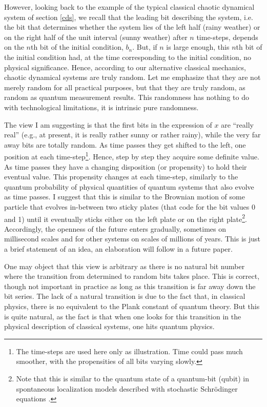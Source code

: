 \documentclass[floatfix,12pt]{article}
\begin{document}
However, looking back to the example of the typical classical chaotic dynamical system of section \ref{cds}, we recall that the leading bit describing the system, i.e. the bit that determines whether the system lies of the left half (rainy weather) or on the right half of the unit interval (sunny weather) after $n$ time-steps, depends on the $n$th bit of the initial condition, $b_n$. But, if $n$ is large enough, this $n$th bit of the initial condition had, at the time corresponding to the initial condition, no physical significance. Hence, according to our alternative classical mechanics, chaotic dynamical systems are truly random. Let me emphasize that they are not merely random for all practical purposes, but that they are truly random, as random as quantum measurement results. This randomness has nothing to do with technological limitations, it is intrinsic pure randomness.

The view I am suggesting is that the first bits in the expression of $x$ are ``really real'' (e.g., at present, it is really rather sunny or rather rainy), while the very far away bits are totally random. As time passes they get shifted to the left, one position at each time-step\footnote{The time-steps are used here only as illustration. Time could pass much smoother, with the propensities of all bits varying slowly.}. Hence, step by step they acquire some definite value. As time passes they have a changing disposition (or propensity) \cite{Dorato11} to hold their eventual value. This propensity changes at each time-step, similarly to the quantum probability of physical quantities of quantum systems that also evolve as time passes. I suggest that this is similar to the Brownian motion of some particle that evolves in-between two sticky plates (that code for the bit values 0 and 1) until it eventually sticks either on the left plate or on the right plate\footnote{Note that this is similar to the quantum state of a quantum-bit (qubit) in spontaneous localization models described with stochastic Schr\"odinger equations \cite{QSD}.}. Accordingly, the openness of the future enters gradually, sometimes on millisecond scales and for other systems on scales of millions of years. This is just a brief statement of an idea, an elaboration will follow in a future paper.

One may object that this view is arbitrary as there is no natural bit number where the transition from determined to random bits takes place. This is correct, though not important in practice as long as this transition is far away down the bit series. The lack of a natural transition is due to the fact that, in classical physics, there is no equivalent to the Plank constant of quantum theory. But this is quite natural, as the fact is that when one looks for this transition in the physical description of classical systems, one hits quantum physics. 
\end{document}
